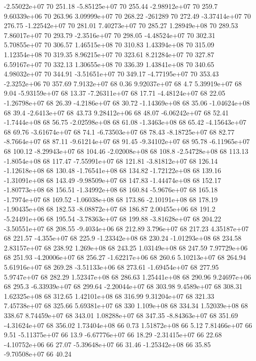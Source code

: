 -2.55022e+07 70 251.18
-5.85125e+07 70 255.44
-2.98912e+07 70 259.7
9.60339e+06 70 263.96
3.09999e+07 70 268.22
-261289 70 272.49
-3.37414e+07 70 276.75
-1.22542e+07 70 281.01
7.40273e+07 70 285.27
1.28949e+08 70 289.53
7.86017e+07 70 293.79
-2.3516e+07 70 298.05
-4.48524e+07 70 302.31
5.70855e+07 70 306.57
1.46515e+08 70 310.83
1.43394e+08 70 315.09
1.12354e+08 70 319.35
8.96215e+07 70 323.61
8.21284e+07 70 327.87
6.59167e+07 70 332.13
1.30655e+08 70 336.39
1.43841e+08 70 340.65
4.98032e+07 70 344.91
-3.51651e+07 70 349.17
-4.77195e+07 70 353.43
-2.3252e+06 70 357.69
7.9132e+07 68 0.36
9.92037e+07 68 4.7
5.39919e+07 68 9.04
-5.93159e+07 68 13.37
-7.26311e+07 68 17.71
-4.48124e+07 68 22.05
-1.26798e+07 68 26.39
-4.2186e+07 68 30.72
-1.14369e+08 68 35.06
-1.04624e+08 68 39.4
-2.6413e+07 68 43.73
9.28412e+06 68 48.07
-6.06242e+07 68 52.41
-1.7444e+08 68 56.75
-2.02598e+08 68 61.08
-1.3463e+08 68 65.42
-4.15643e+07 68 69.76
-3.61674e+07 68 74.1
-6.73503e+07 68 78.43
-8.18725e+07 68 82.77
-8.7664e+07 68 87.11
-9.61214e+07 68 91.45
-9.34102e+07 68 95.78
-6.11965e+07 68 100.12
-8.29943e+07 68 104.46
-2.02008e+08 68 108.8
-2.54728e+08 68 113.13
-1.8054e+08 68 117.47
-7.55991e+07 68 121.81
-3.81812e+07 68 126.14
-1.12618e+08 68 130.48
-1.76541e+08 68 134.82
-1.72122e+08 68 139.16
-1.31091e+08 68 143.49
-9.98509e+07 68 147.83
-1.44474e+08 68 152.17
-1.80773e+08 68 156.51
-1.34992e+08 68 160.84
-5.9676e+07 68 165.18
-1.7974e+07 68 169.52
-1.06038e+08 68 173.86
-2.10191e+08 68 178.19
-1.90435e+08 68 182.53
-8.08872e+07 68 186.87
2.00455e+06 68 191.2
-5.24491e+06 68 195.54
-3.78363e+07 68 199.88
-3.81628e+07 68 204.22
-3.50551e+07 68 208.55
-9.4034e+06 68 212.89
3.796e+07 68 217.23
4.35187e+07 68 221.57
-4.355e+07 68 225.9
-1.23342e+08 68 230.24
-1.01293e+08 68 234.58
2.83157e+07 68 238.92
1.269e+08 68 243.25
1.03149e+08 68 247.59
7.97729e+06 68 251.93
-4.20006e+07 68 256.27
-1.62217e+06 68 260.6
5.10213e+07 68 264.94
5.61916e+07 68 269.28
-3.51133e+06 68 273.61
-1.69454e+07 68 277.95
5.9747e+07 68 282.29
1.52347e+08 68 286.63
1.25441e+08 68 290.96
9.24697e+06 68 295.3
-6.33939e+07 68 299.64
-2.20044e+07 68 303.98
9.4589e+07 68 308.31
1.62325e+08 68 312.65
1.42101e+08 68 316.99
9.31204e+07 68 321.33
7.45738e+07 68 325.66
5.69381e+07 68 330
1.109e+08 68 334.34
1.52039e+08 68 338.67
8.74459e+07 68 343.01
1.08288e+07 68 347.35
-8.84363e+07 68 351.69
-4.31624e+07 68 356.02
1.73404e+08 66 0.73
1.51872e+08 66 5.12
7.81466e+07 66 9.51
-5.11375e+07 66 13.9
-6.67776e+07 66 18.29
-2.31415e+07 66 22.68
-4.10752e+06 66 27.07
-5.39648e+07 66 31.46
-1.25342e+08 66 35.85
-9.70508e+07 66 40.24
